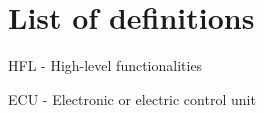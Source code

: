 \section{List of definitions}

\noindent \newline HFL - High-level functionalities 

\noindent \newline ECU - Electronic or electric control unit